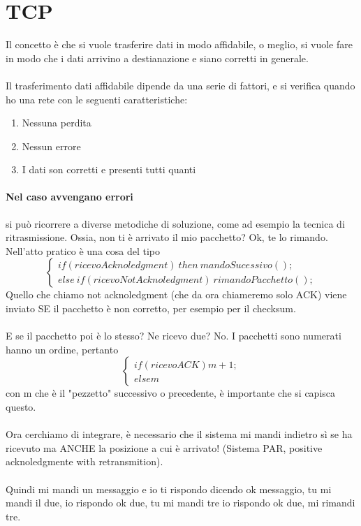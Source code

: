 \documentclass[12pt, a4paper, openany, twoside]{book}
\begin{document}
\section{TCP}
Il concetto è che si vuole trasferire dati in modo affidabile, o meglio, si 
vuole fare in modo che i dati arrivino a destianazione 
e siano corretti in generale.
\\ \\ 
Il trasferimento dati affidabile dipende da una serie di fattori, e si verifica
quando ho una rete con le seguenti caratteristiche:
\begin{enumerate}
	\item Nessuna perdita
	\item Nessun errore
	\item I dati son corretti e presenti tutti quanti
\end{enumerate} 
\paragraph{Nel caso avvengano errori} si può ricorrere a diverse metodiche di
soluzione, come ad esempio la tecnica di ritrasmissione. Ossia, non ti è 
arrivato il mio pacchetto? Ok, te lo rimando. Nell'atto pratico è una cosa del tipo
$$\begin{cases}
if(ricevoAcknoledgment)~then~mandoSucessivo(); \\
else~if(ricevoNotAcknoledgment)~rimandoPacchetto();
\end{cases}$$
Quello che chiamo not acknoledgment (che da ora chiameremo solo ACK) viene 
inviato SE il pacchetto è non corretto, per esempio per il checksum.
\\ \\
E se il pacchetto poi è lo stesso? Ne ricevo due? No. I pacchetti sono numerati
hanno un ordine, pertanto
$$\begin{cases}
if(ricevoACK) m+1;\\
else m
\end{cases}$$
con m che è il "pezzetto" successivo o precedente, è importante che si capisca 
questo.
\\ \\ Ora cerchiamo di integrare, è necessario che il sistema mi mandi indietro
sì se ha ricevuto ma ANCHE la posizione a cui è arrivato! (Sistema PAR, positive
acknoledgmente with retransmition).
\\ \\
Quindi mi mandi un messaggio e io ti rispondo dicendo ok messaggio, tu mi mandi
il due, io rispondo ok due, tu mi mandi tre io rispondo ok due, mi rimandi tre.
\end{document}
